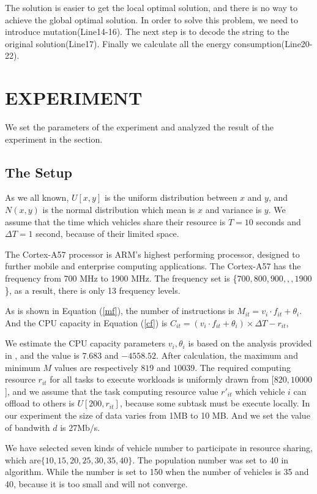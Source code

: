 \documentclass[conference]{IEEEtran}
\begin{document}
The solution is easier to get the local optimal solution, and there is no way to achieve the global optimal solution. In order to solve this problem, we need to introduce mutation(Line14-16). 
The next step is to decode the string to the original solution(Line17).
Finally we calculate all the energy consumption(Line20-22).


\section{EXPERIMENT}
We set the parameters of the experiment and analyzed the result of the experiment in the section.

\subsection{The Setup}
As we all known, $U[x,y]$ is the uniform distribution between $x$ and $y$, and $N(x, y)$ is the normal distribution which  mean is $x$ and variance is $y$. 
We assume that the time which vehicles share their resource is $ T = 10$ seconds and $\Delta T = 1$ second, because of their limited space.

The Cortex-A57 processor is ARM's highest performing processor, designed to further mobile and enterprise computing applications\cite{a57}.
The Cortex-A57 has the frequency from 700 MHz to 1900 MHz. The frequency set is \{$700, 800, 900,,,1900$\}, as a result, there is only 13 frequency levels.

As is shown in Equation (\ref{mf}), the number of instructions is $M_{it} = v_i \cdot f_{it} + \theta_i$. 
And the CPU capacity in Equation (\ref{cf}) is $    	C_{it} = (v_i \cdot f_{it} + \theta_i)   \times \Delta T  - r_{it}$, 

We estimate the CPU capacity parameters $v_i, \theta_i$ is based on the analysis provided in \cite{vecman}, and the value is $7.683$ and $−4558.52$. 
After calculation, the maximum and minimum $M$  values are respectively $819 $ and $ 10039$. 
The required computing resource $r_{it}$ for all tasks to execute workloads is uniformly drawn from [$ 820, 10000  $], and we assume that the task computing resource value $r'_{it}$ which vehicle $i$ can offload to others is $ U[200, r_{it}]$, because some subtask must be execute locally. 
In our experiment the size of data varies from 1MB to 10 MB. And we set the value of bandwith $d$ is 27Mb/s\cite{2017dsrc}.

We have selected seven kinds of vehicle number to participate in resource sharing, which are$\{10,15, 20,25,30,35,40\}$. The population number was set to 40 in algorithm. While the number is set to 150 when the number of vehicles is 35 and 40, because it is too small and  will not converge.
\end{document}
